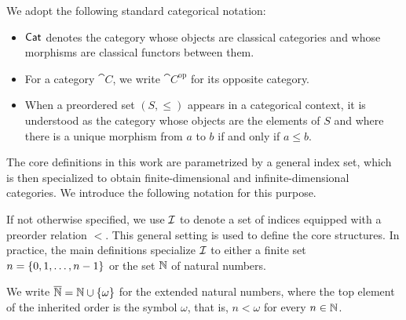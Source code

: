 \begin{notation}
  \label{not:standard_category_theory}
  We adopt the following standard categorical notation:
  \begin{itemize}
    \item $\mathsf{Cat}$ denotes the category whose objects are classical categories and whose morphisms
      are classical functors between them.
    \item For a category $\cat{C}$, we write $\cat{C}^{\mathrm{op}}$ for its opposite category.
    \item When a preordered set $(S, \leq)$ appears in a categorical context, it is understood as
      the category whose objects are the elements of $S$ and where there is a unique morphism from
      $a$ to $b$ if and only if $a \leq b$.
  \end{itemize}
\end{notation}

The core definitions in this work are parametrized by a general index set, which is then
specialized to obtain finite-dimensional and infinite-dimensional categories. We introduce the
following notation for this purpose.

\begin{notation}
  \label{not:index_set}
  If not otherwise specified, we use $\mathcal{I}$ to denote a set of indices equipped with a preorder
  relation $<$. This general setting is used to define the core structures. In practice, the main
  definitions specialize $\mathcal{I}$ to either a finite set $n = \left\{ 0, 1, \ldots, n - 1 \right\}$ or the set
  $\mathbb{N}$ of natural numbers.
\end{notation}

\begin{notation}
  \label{not:extended_naturals}
  We write $\overline{\mathbb{N}} = \mathbb{N} \cup \left\{ \omega \right\}$ for the extended natural numbers, where the top element
  of the inherited order is the symbol $\omega$, that is, $n < \omega$ for every $n \in \mathbb{N}$.
\end{notation}
